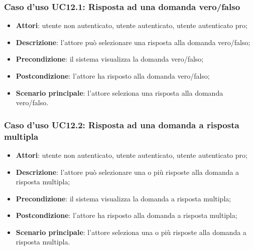 \subsubsection{Caso d'uso UC12.1: Risposta ad una domanda vero/falso}
\begin{itemize}
\item \textbf{Attori}: utente non autenticato, utente autenticato, utente autenticato pro;
\item \textbf{Descrizione}: l'attore può selezionare una risposta alla domanda vero/falso;
\item \textbf{Precondizione}: il sistema visualizza la domanda vero/falso;
\item \textbf{Postcondizione}: l'attore ha risposto alla domanda vero/falso;
\item \textbf{Scenario principale}: l'attore seleziona una risposta alla domanda vero/falso.
\end{itemize}

\subsubsection{Caso d'uso UC12.2: Risposta ad una domanda a risposta multipla}
\begin{itemize}
\item \textbf{Attori}: utente non autenticato, utente autenticato, utente autenticato pro;
\item \textbf{Descrizione}: l'attore può selezionare una o più risposte alla domanda a risposta multipla;
\item \textbf{Precondizione}: il sistema visualizza la domanda a risposta multipla;
\item \textbf{Postcondizione}: l'attore ha risposto alla domanda a risposta multipla;
\item \textbf{Scenario principale}: l'attore seleziona una o più risposte alla domanda a risposta multipla.
\end{itemize}


